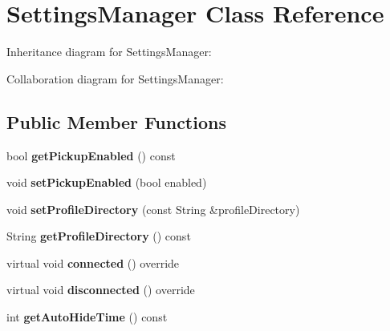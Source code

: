 \hypertarget{class_settings_manager}{}\section{Settings\+Manager Class Reference}
\label{class_settings_manager}


Inheritance diagram for Settings\+Manager\+:


Collaboration diagram for Settings\+Manager\+:
\subsection*{Public Member Functions}
\begin{DoxyCompactItemize}
\item 
bool {\bfseries get\+Pickup\+Enabled} () const \hypertarget{class_settings_manager_abdb671f1012b61e3939d66e2c5a51ed6}{}\label{class_settings_manager_abdb671f1012b61e3939d66e2c5a51ed6}

\item 
void {\bfseries set\+Pickup\+Enabled} (bool enabled)\hypertarget{class_settings_manager_a625341681109806d4ab2b2501ba30ab9}{}\label{class_settings_manager_a625341681109806d4ab2b2501ba30ab9}

\item 
void {\bfseries set\+Profile\+Directory} (const String \&profile\+Directory)\hypertarget{class_settings_manager_a407dad99584114520c5aadc58b8bf941}{}\label{class_settings_manager_a407dad99584114520c5aadc58b8bf941}

\item 
String {\bfseries get\+Profile\+Directory} () const \hypertarget{class_settings_manager_aeaf4fd67dc3a4733dcf37bfadaa4de49}{}\label{class_settings_manager_aeaf4fd67dc3a4733dcf37bfadaa4de49}

\item 
virtual void {\bfseries connected} () override\hypertarget{class_settings_manager_a2d5e6d9c21a5ea7e574ca600a1d93719}{}\label{class_settings_manager_a2d5e6d9c21a5ea7e574ca600a1d93719}

\item 
virtual void {\bfseries disconnected} () override\hypertarget{class_settings_manager_a607feb1bce6a53dc2907653566a43977}{}\label{class_settings_manager_a607feb1bce6a53dc2907653566a43977}

\item 
int {\bfseries get\+Auto\+Hide\+Time} () const \hypertarget{class_settings_manager_a537a0bf338c4020efa197188a0deec49}{}\label{class_settings_manager_a537a0bf338c4020efa197188a0deec49}


\end{DoxyCompactItemize}
